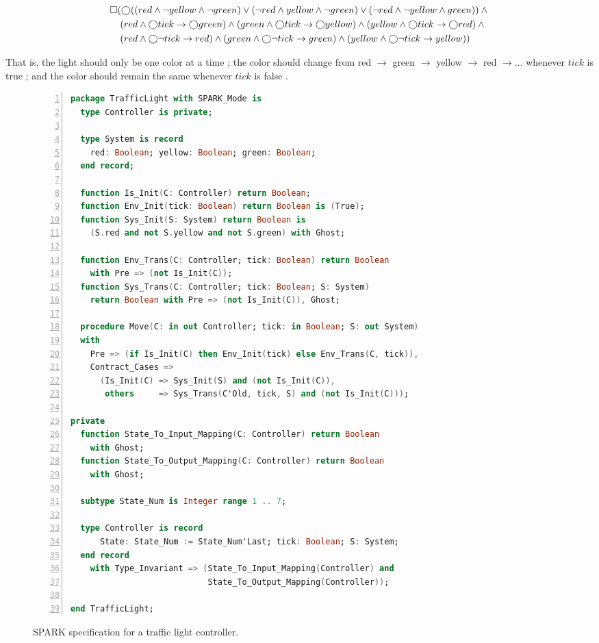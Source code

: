 \documentclass[runningheads]{llncs}
\begin{document}
{\scriptsize
\begin{align}
\square & (\varbigcirc ( (red \land \lnot yellow \land \lnot green) \lor (\lnot red \land yellow \land \lnot green) \lor (\lnot red \land \lnot yellow \land green)) \land \mbox{}  \label{eq:mutex} \\
	& \; (red \land \varbigcirc tick \rightarrow \varbigcirc green) \land (green \land \varbigcirc tick \rightarrow \varbigcirc yellow) \land (yellow \land \varbigcirc tick \rightarrow \varbigcirc red) \land \mbox{}  \label{eq:change} \\
	& \; (red \land \varbigcirc \lnot tick \rightarrow red) \land (green \land \varbigcirc \lnot tick \rightarrow green) \land (yellow \land \varbigcirc \lnot tick \rightarrow yellow) \label{eq:same})
\end{align}
}


\noindent That is, the light should only be one color at a time ; 
the color should change from red $\rightarrow$ green $\rightarrow$ yellow $\rightarrow$ red $\rightarrow \ldots$ whenever $tick$ is true ; 
and the color should remain the same whenever $tick$ is false .

\begin{figure}
\begin{lstlisting}[language={Ada}, basicstyle=\scriptsize, numbers=left]
package TrafficLight with SPARK_Mode is
  type Controller is private;
  
  type System is record
    red: Boolean; yellow: Boolean; green: Boolean;
  end record;
  
  function Is_Init(C: Controller) return Boolean;
  function Env_Init(tick: Boolean) return Boolean is (True);
  function Sys_Init(S: System) return Boolean is 
    (S.red and not S.yellow and not S.green) with Ghost;
    
  function Env_Trans(C: Controller; tick: Boolean) return Boolean
    with Pre => (not Is_Init(C));
  function Sys_Trans(C: Controller; tick: Boolean; S: System) 
    return Boolean with Pre => (not Is_Init(C)), Ghost;
    
  procedure Move(C: in out Controller; tick: in Boolean; S: out System)
  with 
    Pre => (if Is_Init(C) then Env_Init(tick) else Env_Trans(C, tick)),
    Contract_Cases =>
      (Is_Init(C) => Sys_Init(S) and (not Is_Init(C)),
       others     => Sys_Trans(C'Old, tick, S) and (not Is_Init(C)));

private
  function State_To_Input_Mapping(C: Controller) return Boolean
    with Ghost;
  function State_To_Output_Mapping(C: Controller) return Boolean
    with Ghost;
  
  subtype State_Num is Integer range 1 .. 7;
  
  type Controller is record
      State: State_Num := State_Num'Last; tick: Boolean; S: System;
  end record
    with Type_Invariant => (State_To_Input_Mapping(Controller) and 
                            State_To_Output_Mapping(Controller));
      
end TrafficLight;
\end{lstlisting}
  \caption{SPARK specification for a traffic light controller.}
  \label{fig:trafficLightSpec}
\end{figure}
\end{document}
